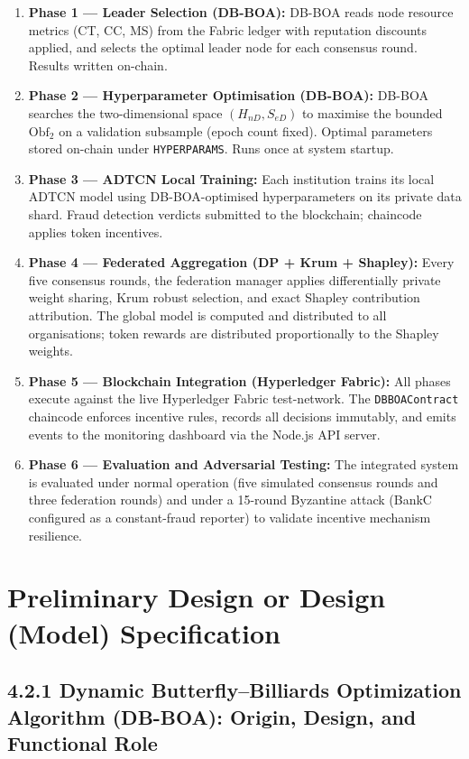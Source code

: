 \begin{enumerate}
    \item \textbf{Phase 1 — Leader Selection (DB-BOA):} DB-BOA reads node resource metrics (CT, CC, MS) from the Fabric ledger with reputation discounts applied, and selects the optimal leader node for each consensus round. Results written on-chain.
    \item \textbf{Phase 2 — Hyperparameter Optimisation (DB-BOA):} DB-BOA searches the two-dimensional space $(H_{nD}, S_{eD})$ to maximise the bounded $\mathrm{Obf}_2$ on a validation subsample (epoch count fixed). Optimal parameters stored on-chain under \texttt{HYPERPARAMS}. Runs once at system startup.
    \item \textbf{Phase 3 — ADTCN Local Training:} Each institution trains its local ADTCN model using DB-BOA-optimised hyperparameters on its private data shard. Fraud detection verdicts submitted to the blockchain; chaincode applies token incentives.
    \item \textbf{Phase 4 — Federated Aggregation (DP + Krum + Shapley):} Every five consensus rounds, the federation manager applies differentially private weight sharing, Krum robust selection, and exact Shapley contribution attribution. The global model is computed and distributed to all organisations; token rewards are distributed proportionally to the Shapley weights.
    \item \textbf{Phase 5 — Blockchain Integration (Hyperledger Fabric):} All phases execute against the live Hyperledger Fabric test-network. The \texttt{DBBOAContract} chaincode enforces incentive rules, records all decisions immutably, and emits events to the monitoring dashboard via the Node.js API server.
    \item \textbf{Phase 6 — Evaluation and Adversarial Testing:} The integrated system is evaluated under normal operation (five simulated consensus rounds and three federation rounds) and under a 15-round Byzantine attack (BankC configured as a constant-fraud reporter) to validate incentive mechanism resilience.
\end{enumerate}

\section{Preliminary Design or Design (Model) Specification}

\subsection*{4.2.1 Dynamic Butterfly–Billiards Optimization Algorithm (DB-BOA): Origin, Design, and Functional Role}


